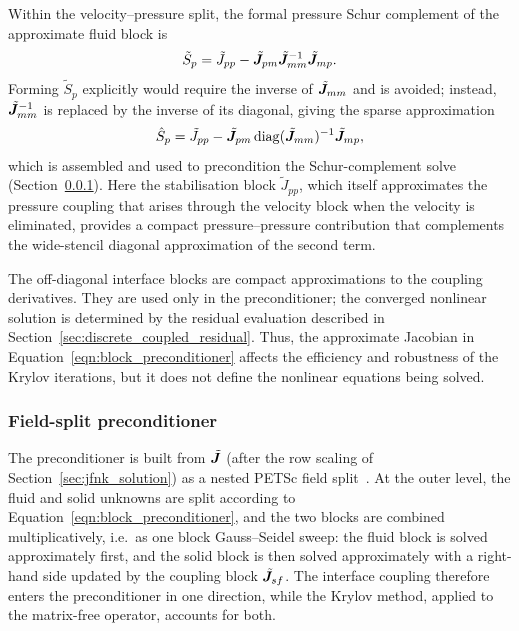 Within the velocity--pressure split, the formal pressure Schur complement of the approximate fluid block is
\begin{equation}
\tilde{S}_p = \tilde{J}_{pp} - \tilde{\boldsymbol{J}}_{pm}\tilde{\boldsymbol{J}}_{mm}^{-1}\tilde{\boldsymbol{J}}_{mp}.
\label{eqn:schur_complement}
\end{equation}
Forming $\tilde{S}_p$ explicitly would require the inverse of $\tilde{\boldsymbol{J}}_{mm}$ and is avoided; instead, $\tilde{\boldsymbol{J}}_{mm}^{-1}$ is replaced by the inverse of its diagonal, giving the sparse approximation
\begin{equation}
\hat{S}_p = \tilde{J}_{pp} - \tilde{\boldsymbol{J}}_{pm}\,\mathrm{diag}(\tilde{\boldsymbol{J}}_{mm})^{-1}\tilde{\boldsymbol{J}}_{mp},
\label{eqn:schur_complement_approx}
\end{equation}
which is assembled and used to precondition the Schur-complement solve (Section~\ref{sec:fieldsplit}).
Here the stabilisation block $\tilde{J}_{pp}$, which itself approximates the pressure coupling that arises through the velocity block when the velocity is eliminated, provides a compact pressure--pressure contribution that complements the wide-stencil diagonal approximation of the second term.

The off-diagonal interface blocks are compact approximations to the coupling
derivatives. They are used only in the preconditioner; the converged nonlinear
solution is determined by the residual evaluation described in
Section~\ref{sec:discrete_coupled_residual}. Thus, the approximate Jacobian in
Equation~\eqref{eqn:block_preconditioner} affects the efficiency and robustness
of the Krylov iterations, but it does not define the nonlinear equations being
solved.

\subsubsection{Field-split preconditioner}
\label{sec:fieldsplit}

The preconditioner is built from $\tilde{\boldsymbol{J}}$ (after the row scaling of Section~\ref{sec:jfnk_solution}) as a nested PETSc field split~\citep{PETSc}.
At the outer level, the fluid and solid unknowns are split according to Equation~\eqref{eqn:block_preconditioner}, and the two blocks are combined multiplicatively, i.e.\ as one block Gauss--Seidel sweep: the fluid block is solved approximately first, and the solid block is then solved approximately with a right-hand side updated by the coupling block $\tilde{\boldsymbol{J}}_{sf}$.
The interface coupling therefore enters the preconditioner in one direction, while the Krylov method, applied to the matrix-free operator, accounts for both.

